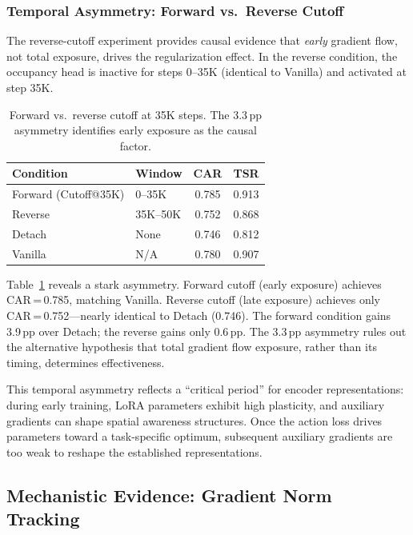 \documentclass[10pt,twocolumn]{article}
\begin{document}
\subsubsection{Temporal Asymmetry: Forward vs.\ Reverse Cutoff}

The reverse-cutoff experiment provides causal evidence that \emph{early} gradient flow, not total exposure, drives the regularization effect.
In the reverse condition, the occupancy head is inactive for steps 0--35K (identical to Vanilla) and activated at step 35K.

\begin{table}[t]
\centering
\caption{Forward vs.\ reverse cutoff at 35K steps. The 3.3\,pp asymmetry identifies early exposure as the causal factor.}
\label{tab:reverse}
\small
\begin{tabular}{@{}llcc@{}}
\toprule
Condition & Window & CAR & TSR \\
\midrule
Forward (Cutoff@35K) & 0--35K  & 0.785 & 0.913 \\
Reverse              & 35K--50K & 0.752 & 0.868 \\
\midrule
Detach               & None     & 0.746 & 0.812 \\
Vanilla              & N/A      & 0.780 & 0.907 \\
\bottomrule
\end{tabular}
\end{table}

Table~\ref{tab:reverse} reveals a stark asymmetry.
Forward cutoff (early exposure) achieves CAR\,=\,0.785, matching Vanilla.
Reverse cutoff (late exposure) achieves only CAR\,=\,0.752---nearly identical to Detach (0.746).
The forward condition gains 3.9\,pp over Detach; the reverse gains only 0.6\,pp.
The 3.3\,pp asymmetry rules out the alternative hypothesis that total gradient flow exposure, rather than its timing, determines effectiveness.

This temporal asymmetry reflects a ``critical period'' for encoder representations: during early training, LoRA parameters exhibit high plasticity, and auxiliary gradients can shape spatial awareness structures.
Once the action loss drives parameters toward a task-specific optimum, subsequent auxiliary gradients are too weak to reshape the established representations.

\subsection{Mechanistic Evidence: Gradient Norm Tracking}
\label{sec:gradnorm}
\end{document}
